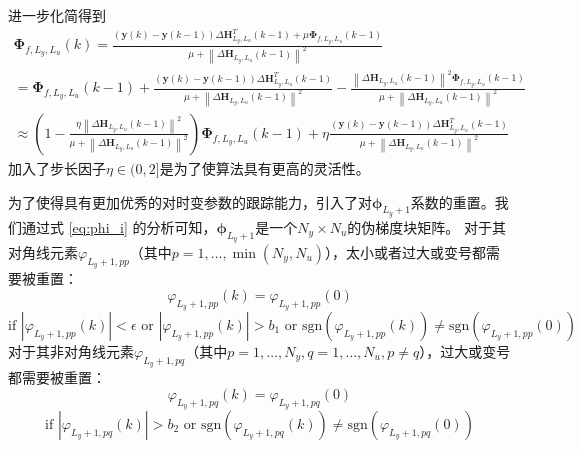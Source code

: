       进一步化简得到
      \begin{equation}
      \begin{aligned}
      \boldsymbol{\Phi}_{f,L_y,L_u}(k) = \frac{\left( \boldsymbol{y}(k) - \boldsymbol{y}(k - 1) \right) \Delta \boldsymbol{H}_{L_y,L_u}^T(k - 1) + \mu \boldsymbol{\Phi}_{f,L_y,L_u}(k - 1)}{\mu + \left\| \Delta \boldsymbol{H}_{L_y,L_u}(k - 1) \right\|^2} \\
      = \boldsymbol{\Phi}_{f,L_y,L_u}(k - 1) + \frac{\left( \boldsymbol{y}(k) - \boldsymbol{y}(k - 1) \right) \Delta \boldsymbol{H}_{L_y,L_u}^T(k - 1)}{\mu + \left\| \Delta \boldsymbol{H}_{L_y,L_u}(k - 1) \right\|^2} - \frac{\left\| \Delta \boldsymbol{H}_{L_y,L_u}(k - 1) \right\|^2 \boldsymbol{\Phi}_{f,L_y,L_u}(k - 1)}{\mu + \left\| \Delta \boldsymbol{H}_{L_y,L_u}(k - 1) \right\|^2} \\
      \approx \left( 1 - \frac{\eta \left\| \Delta \boldsymbol{H}_{L_y,L_u}(k - 1) \right\|^2}{\mu + \left\| \Delta \boldsymbol{H}_{L_y,L_u}(k - 1) \right\|^2} \right) \boldsymbol{\Phi}_{f,L_y,L_u}(k - 1) + \eta \frac{\left( \boldsymbol{y}(k) - \boldsymbol{y}(k - 1) \right) \Delta \boldsymbol{H}_{L_y,L_u}^T(k - 1)}{\mu + \left\| \Delta \boldsymbol{H}_{L_y,L_u}(k - 1) \right\|^2}
      \end{aligned}
      \label{eq:phi_update}
      \end{equation}
      加入了步长因子$\eta \in (0,2]$是为了使算法具有更高的灵活性。

      为了使得具有更加优秀的对时变参数的跟踪能力，引入了对$\boldsymbol{\phi}_{L_y+1}$系数的重置。我们通过式 \eqref{eq:phi_i} 的分析可知，$\boldsymbol{\phi}_{L_y+1}$是一个$N_y \times N_u$的伪梯度块矩阵。
      对于其对角线元素$\varphi_{L_y+1,pp}$（其中$p = 1,\dots,\min(N_y,N_u)$），太小或者过大或变号都需要被重置：
      \begin{equation}
      \varphi_{L_y+1,pp}(k) = \varphi_{L_y+1,pp}(0)
      \end{equation}
      \begin{equation}
      \text{if } \left| \varphi_{L_y+1,pp}(k) \right| < \epsilon \text{ or } \left| \varphi_{L_y+1,pp}(k) \right| > b_1 \text{ or } \mathrm{sgn}\left( \varphi_{L_y+1,pp}(k) \right) \neq \mathrm{sgn}\left( \varphi_{L_y+1,pp}(0) \right)
      \label{eq:phi_diag_reset}
      \end{equation}
      对于其非对角线元素$\varphi_{L_y+1,pq}$（其中$p = 1,\dots,N_y, q = 1,\dots,N_u, p \neq q$），过大或变号都需要被重置：
      \begin{equation}
      \varphi_{L_y+1,pq}(k) = \varphi_{L_y+1,pq}(0)
      \end{equation}
      \begin{equation}
      \text{if } \left| \varphi_{L_y+1,pq}(k) \right| > b_2 \text{ or } \mathrm{sgn}\left( \varphi_{L_y+1,pq}(k) \right) \neq \mathrm{sgn}\left( \varphi_{L_y+1,pq}(0) \right)
      \label{eq:phi_offdiag_reset}
      \end{equation}
      
